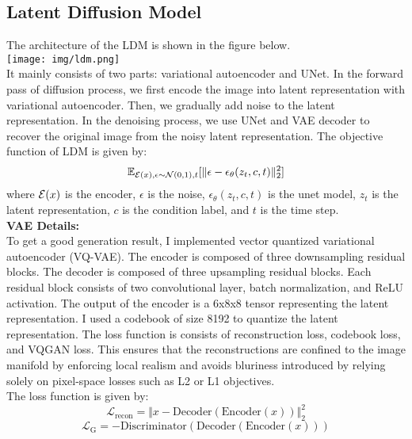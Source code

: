 \documentclass{article} %
\begin{document}
    \subsection{Latent Diffusion Model}
    The architecture of the LDM is shown in the figure below. \\
    \texttt{[image: img/ldm.png]} \\
    It mainly consists of two parts: variational autoencoder and UNet.
    In the forward pass of diffusion process, we first encode the image into latent representation with variational autoencoder. 
    Then, we gradually add noise to the latent representation. In the denoising process, we use UNet and VAE decoder to recover the original image from the noisy latent representation.
    The objective function of LDM is given by:
    \begin{equation}
        \mathbb{E}_{{\cal E}(x), \epsilon \sim \mathcal{N}(0, 1), t} [\Vert{\epsilon - \epsilon_{\theta}(z_t, c, t)}\Vert_{2}^{2}]
    \end{equation}
    where ${\cal E}(x)$ is the encoder, $\epsilon$ is the noise, $\epsilon_{\theta}(z_t, c, t)$ is the unet model, $z_t$ is the latent representation, $c$ is the condition label, and $t$ is the time step. \\
    \textbf{VAE Details:} \\
    To get a good generation result, I implemented vector quantized variational autoencoder (VQ-VAE). 
    The encoder is composed of three downsampling residual blocks. The decoder is composed of three upsampling residual blocks. Each residual block consists of two convolutional layer, batch normalization, and ReLU activation.
    The output of the encoder is a 6x8x8 tensor representing the latent representation. I used a codebook of size 8192 to quantize the latent representation. 
    The loss function is consists of reconstruction loss, codebook loss, and VQGAN loss. This ensures that the reconstructions are confined to the image manifold by enforcing local realism and avoids bluriness introduced by relying
    solely on pixel-space losses such as L2 or L1 objectives.\\
    The loss function is given by:
    \begin{equation}
        \mathcal{L}_{\text{recon}} = \Vert x - \text{Decoder}(\text{Encoder}(x)) \Vert_2^2
    \end{equation}
    \begin{equation}
        \mathcal{L}_{\text{G}} = -\text{Discriminator}(\text{Decoder}(\text{Encoder}(x)))
    \end{equation}
\end{document}
